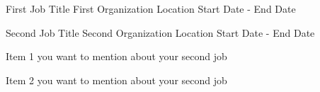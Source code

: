 


\begin{cventries}


\cventry
{\footnotesize{First Job Title}} %
{First Organization} %
{Location} %
{Start Date - End Date} %
{
}

\cventry
{\footnotesize{Second Job Title}} %
{Second Organization} %
{Location} %
{Start Date - End Date} %
{
\begin{cvitems}
\item {Item 1 you want to mention about your second job}
\item {Item 2 you want to mention about your second job}
\end{cvitems}
}

\end{cventries}
